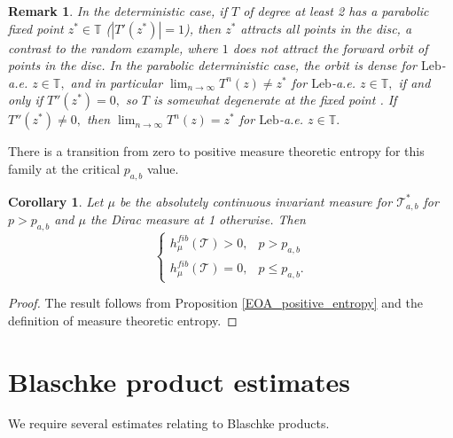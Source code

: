 \documentclass[12pt,reqno]{amsart}
\numberwithin{theorem}{section}
\newtheorem{remark}[theorem]{Remark}%
\newtheorem{corollary}[theorem]{Corollary}
\begin{document}
\begin{remark}
    In the deterministic case, if $T$ of degree at least 2 has a parabolic fixed point $z^{*}\in\mathbb{T}$ ($|T'(z^{*})|=1$), then $z^{*}$ attracts all points in the disc, a contrast to the random example, where $1$ does not attract the forward orbit of points in the disc. In the parabolic deterministic case, the orbit is dense for $\text{Leb}$-a.e. $z\in\mathbb{T},$ and in particular $\lim_{n\to\infty}T^n(z)\neq z^{*}$ for $\text{Leb}$-a.e. $z\in\mathbb{T},$ if and only if $T''(z^{*})=0,$ so $T$ is somewhat degenerate at the fixed point \cite{baker_domains2}. If $T''(z^{*})\neq0,$ then $\lim_{n\to\infty}T^n(z)=z^{*}$ for $\text{Leb}$-a.e. $z\in\mathbb{T}.$ 
\end{remark}


There is a transition from zero to positive measure theoretic entropy for this family at the critical $p_{a,b}$ value. 
\begin{corollary}
    Let $\mu$ be the absolutely continuous invariant measure for $\mathcal{T}_{a,b}^{*}$ for $p>p_{a,b}$ and $\mu$ the Dirac measure at 1 otherwise.  Then $$\begin{cases}h_{\mu}^{fib}(\mathcal{T})>0,&p>p_{a,b}\\h_{\mu}^{fib}(\mathcal{T})=0,&p\le p_{a,b}.
        
    \end{cases}$$

\end{corollary}
\begin{proof}
    The result follows from Proposition \ref{EOA_positive_entropy} and the definition of measure theoretic entropy.
\end{proof}

\appendix
\section{Blaschke product estimates}
We require several estimates relating to Blaschke products. 
\end{document}
